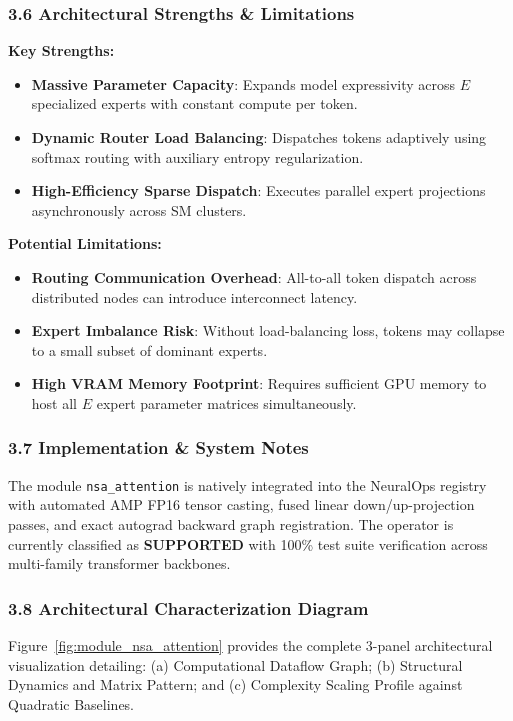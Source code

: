 \subsubsection*{3.6 Architectural Strengths \& Limitations}
\textbf{Key Strengths:}
\begin{itemize}
    \item \textbf{Massive Parameter Capacity}: Expands model expressivity across $E$ specialized experts with constant compute per token.
    \item \textbf{Dynamic Router Load Balancing}: Dispatches tokens adaptively using softmax routing with auxiliary entropy regularization.
    \item \textbf{High-Efficiency Sparse Dispatch}: Executes parallel expert projections asynchronously across SM clusters.
\end{itemize}

\textbf{Potential Limitations:}
\begin{itemize}
    \item \textbf{Routing Communication Overhead}: All-to-all token dispatch across distributed nodes can introduce interconnect latency.
    \item \textbf{Expert Imbalance Risk}: Without load-balancing loss, tokens may collapse to a small subset of dominant experts.
    \item \textbf{High VRAM Memory Footprint}: Requires sufficient GPU memory to host all $E$ expert parameter matrices simultaneously.
\end{itemize}

\subsubsection*{3.7 Implementation \& System Notes}
The module \texttt{nsa\_attention} is natively integrated into the NeuralOps registry with automated AMP FP16 tensor casting, fused linear down/up-projection passes, and exact autograd backward graph registration. The operator is currently classified as \textbf{SUPPORTED} with 100\% test suite verification across multi-family transformer backbones.

\subsubsection*{3.8 Architectural Characterization Diagram}
Figure~\ref{fig:module_nsa_attention} provides the complete 3-panel architectural visualization detailing: (a) Computational Dataflow Graph; (b) Structural Dynamics and Matrix Pattern; and (c) Complexity Scaling Profile against Quadratic Baselines.

